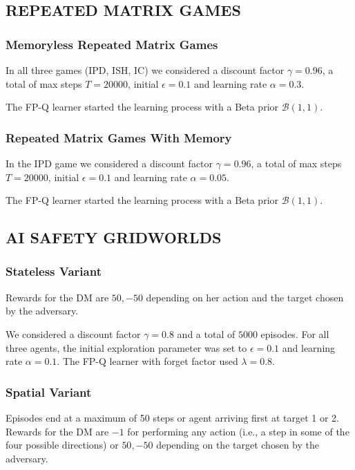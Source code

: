 \documentclass[letterpaper]{article} %
\begin{document}
\subsection{REPEATED MATRIX GAMES}

\subsubsection{Memoryless Repeated Matrix Games}

In all three games (IPD, ISH, IC) we considered a discount factor $\gamma = 0.96$, a total of max steps $T = 20000$, initial $\epsilon = 0.1$ and learning rate $\alpha = 0.3$. 

The FP-Q learner started the learning process with a Beta prior $\mathcal{B}(1,1)$.

\subsubsection{Repeated Matrix Games With Memory}

In the IPD game we considered a discount factor $\gamma = 0.96$, a total of max steps $T = 20000$, initial $\epsilon = 0.1$ and learning rate $\alpha = 0.05$. 

The FP-Q learner started the learning process with a Beta prior $\mathcal{B}(1,1)$.

\subsection{AI SAFETY GRIDWORLDS}

\subsubsection{Stateless Variant}

Rewards for the DM are $50, -50$ depending on her action and the target chosen by the adversary.

We considered a discount factor $\gamma = 0.8$ and a total of $5000$ episodes. For all three agents, the initial exploration parameter was set to $\epsilon = 0.1$ and learning rate $\alpha = 0.1$. The FP-Q learner with forget factor used $\lambda = 0.8$.




\subsubsection{Spatial Variant}

Episodes end at a maximum of 50 steps or agent arriving first at target 1 or 2. Rewards for the DM are $-1$ for performing any action (i.e., a step in some of the four possible directions) or $50, -50$ depending on the target chosen by the adversary.
\end{document}
